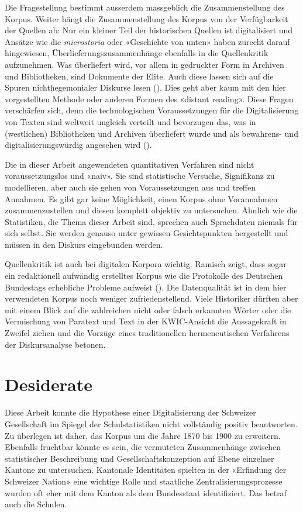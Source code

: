 Die Fragestellung bestimmt ausserdem massgeblich die Zusammenstellung des Korpus. Weiter hängt die Zusammenstellung des Korpus von der Verfügbarkeit der Quellen ab: Nur ein kleiner Teil der historischen Quellen ist digitalisiert und Ansätze wie die \textit{micro\-storia} oder «Geschichte von unten» haben zurecht darauf hingewiesen, Über\-lieferungs\-zusammen\-hänge ebenfalls in die Quellen\-kritik aufzunehmen. Was überliefert wird, vor allem in gedruckter Form in Archiven und Bibliotheken, sind Dokumente der Elite. Auch diese lassen sich auf die Spuren nicht\-hegemonialer Diskurse lesen (\cite{guha_chandras_1987}). Dies geht aber kaum mit den hier vorgestellten Methode oder anderen Formen des «distant reading». Diese Fragen verschärfen sich, denn die technologischen Voraussetzungen für die Digitalisierung von Texten sind weltweit ungleich verteilt und bevorzugen das, was in (westlichen) Bibliotheken und Archiven überliefert wurde und als bewahrens- und digitalisierungs\-würdig angesehen wird (\cite{putnam_transnational_2016}).

Die in dieser Arbeit angewendeten quantitativen Verfahren sind nicht voraussetzungslos und «naiv». Sie sind statistische Versuche, Signifikanz zu modellieren, aber auch sie gehen von Voraussetzungen aus und treffen Annahmen. Es gibt gar keine Möglichkeit, einen Korpus ohne Vorannahmen zusammenzustellen und diesen komplett objektiv zu untersuchen. Ähnlich wie die Statistiken, die Thema dieser Arbeit sind, sprechen auch Sprachdaten niemals für sich selbst. Sie werden genauso unter gewissen Gesichtspunkten hergestellt und müssen in den Diskurs eingebunden werden.

Quellenkritik ist auch bei digitalen Korpora wichtig. Ramisch zeigt, dass sogar ein redaktionell aufwändig erstelltes Korpus wie die Protokolle des Deutschen Bundestags erhebliche Probleme aufweist (\cite{ramisch_open_2022}). Die Datenqualität ist in dem hier verwendeten Korpus noch weniger zufriedenstellend. Viele Historiker dürften aber mit einem Blick auf die zahlreichen nicht oder falsch erkannten Wörter oder die Vermischung von Paratext und Text in der KWIC-Ansicht die Aussagekraft in Zweifel ziehen und die Vorzüge eines traditionellen hermeneutischen Verfahrens der Diskursanalyse betonen.

\section{Desiderate}

Diese Arbeit konnte die Hypothese einer Digitalisierung der Schweizer Gesellschaft im Spiegel der Schulstatistiken nicht vollständig positiv beantworten. Zu überlegen ist daher, das Korpus um die Jahre 1870 bis 1900 zu erweitern. Ebenfalls fruchtbar könnte es sein, die vermuteten Zusammenhänge zwischen statistischer Beschreibung und Gesellschaftskonzeption auf Ebene einzelner Kantone zu untersuchen. Kantonale Identitäten spielten in der «Erfindung der Schweizer Nation» eine wichtige Rolle und staatliche Zentralisierungsprozesse wurden oft eher mit dem Kanton als dem Bundesstaat identifiziert. Das betraf auch die Schulen. 

